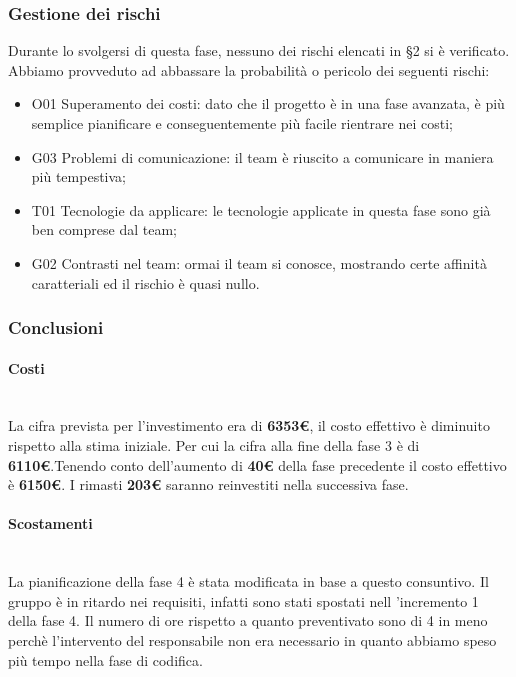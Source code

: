 	\subsubsection{Gestione dei rischi}
	Durante lo svolgersi di questa fase, nessuno dei rischi elencati in \S2 si è verificato. Abbiamo provveduto ad abbassare la probabilità o pericolo dei seguenti rischi: 
	\begin{itemize}
	\item 		O01 Superamento dei costi: dato che il progetto è in una fase avanzata, è più semplice pianificare e conseguentemente più facile rientrare nei costi;
	\item 		G03 Problemi di comunicazione: il team è riuscito a comunicare in maniera più tempestiva;
	\item		T01 Tecnologie da applicare: le tecnologie applicate in questa fase sono già ben comprese dal team;
	\item 		G02 Contrasti nel team: ormai il team si conosce, mostrando certe affinità caratteriali ed il rischio è quasi nullo.
	\end{itemize}

	\subsubsection{Conclusioni}
	\paragraph{Costi\\}\noindent\\
 La cifra prevista per l'investimento era di \textbf{6353€}, il costo effettivo è diminuito rispetto alla stima iniziale. Per cui la cifra alla fine della fase 3 è di \textbf{6110€}.Tenendo conto dell'aumento di \textbf{40€} della fase precedente il costo effettivo è \textbf{6150€}.
I rimasti \textbf{203€} saranno reinvestiti nella successiva fase.

\paragraph{Scostamenti\\}\noindent\\
La pianificazione della fase 4 è stata modificata in base a questo consuntivo.
Il gruppo è in ritardo nei requisiti, infatti sono stati spostati nell 'incremento 1 della fase 4. Il numero di ore rispetto a quanto preventivato sono di 4 in meno perchè l'intervento del responsabile non era necessario in quanto abbiamo speso più tempo nella fase di codifica.

